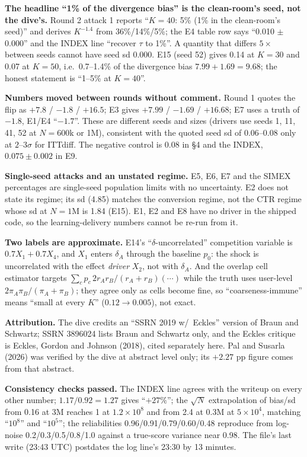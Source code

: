 \begin{reviewernote}[(compiler)]
\textbf{The headline ``1\% of the divergence bias'' is the clean-room's seed, not the dive's.} Round 2 attack 1 reports ``$K = 40$: 5\% (1\% in the clean-room's seed)'' and derives $K^{-1.4}$ from 36\%/14\%/5\%; the E4 table row says ``0.010 $\pm$ 0.000'' and the INDEX line ``recover $\tau$ to 1\%''. A quantity that differs $5\times$ between seeds cannot have seed sd 0.000. E15 (seed 52) gives 0.14 at $K = 30$ and 0.07 at $K = 50$, i.e.\ 0.7--1.4\% of the divergence bias $7.99 + 1.69 = 9.68$; the honest statement is ``1--5\% at $K = 40$''.

\textbf{Numbers moved between rounds without comment.} Round 1 quotes the flip as $+7.8$ / $-1.8$ / $+16.5$; E3 gives $+7.99$ / $-1.69$ / $+16.68$; E7 uses a truth of $-1.8$, E1/E4 ``$-1.7$''. These are different seeds and sizes (drivers use seeds 1, 11, 41, 52 at $N = 600$k or 1M), consistent with the quoted seed sd of 0.06--0.08 only at $2$--$3\sigma$ for ITTdiff. The negative control is 0.08 in \S4 and the INDEX, $0.075 \pm 0.002$ in E9.

\textbf{Single-seed attacks and an unstated regime.} E5, E6, E7 and the SIMEX percentages are single-seed population limits with no uncertainty. E2 does not state its regime; its sd (4.85) matches the conversion regime, not the CTR regime whose sd at $N = 1$M is 1.84 (E15). E1, E2 and E8 have no driver in the shipped code, so the learning-delivery numbers cannot be re-run from it.

\textbf{Two labels are approximate.} E14's ``$\delta$-uncorrelated'' competition variable is $0.7X_1 + 0.7X_4$, and $X_1$ enters $\delta_A$ through the baseline $p_0$: the shock is uncorrelated with the effect \emph{driver} $X_2$, not with $\delta_A$. And the overlap cell estimator targets $\sum_c p_c\,2r_Ar_B/(r_A+r_B)(\cdots)$ while the truth uses user-level $2\pi_A\pi_B/(\pi_A+\pi_B)$; they agree only as cells become fine, so ``coarseness-immune'' means ``small at every $K$'' ($0.12 \to 0.005$), not exact.

\textbf{Attribution.} The dive credits an ``SSRN 2019 w/\ Eckles'' version of Braun and Schwartz; SSRN 3896024 lists Braun and Schwartz only, and the Eckles critique is Eckles, Gordon and Johnson (2018), cited separately here. Pal and Susarla (2026) was verified by the dive at abstract level only; its $+2.27$ pp figure comes from that abstract.

\textbf{Consistency checks passed.} The INDEX line agrees with the writeup on every other number; $1.17/0.92 = 1.27$ gives ``$+27\%$''; the $\sqrt N$ extrapolation of bias/sd from 0.16 at 3M reaches 1 at $1.2\times10^8$ and from 2.4 at 0.3M at $5\times10^4$, matching ``$10^8$'' and ``$10^5$''; the reliabilities 0.96/0.91/0.79/0.60/0.48 reproduce from log-noise 0.2/0.3/0.5/0.8/1.0 against a true-score variance near 0.98. The file's last write (23:43 UTC) postdates the log line's 23:30 by 13 minutes.
\end{reviewernote}

